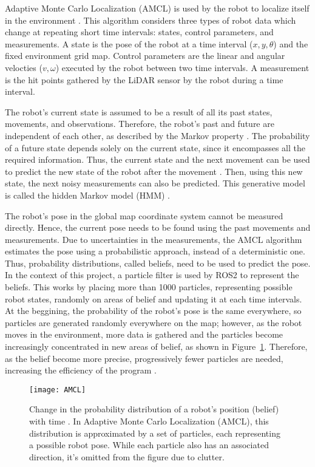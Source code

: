 Adaptive Monte Carlo Localization (AMCL) is used by the robot to localize itself in the environment \parencite{thrunProbabilisticRobotics2006}. This algorithm considers three types of robot data which change at repeating short time intervals: states, control parameters, and measurements. A state is the pose of the robot at a time interval ($x,y,\theta$) and the fixed environment grid map. Control parameters are the linear and angular velocties ($v,\omega$) executed by the robot between two time intervals. A measurement is the hit points gathered by the LiDAR sensor by the robot during a time interval.

The robot's current state is assumed to be a result of all its past states, movements, and observations. Therefore, the robot's past and future are independent of each other, as described by the Markov property \parencite{MarkovProperty2024a}. The probability of a future state depends solely on the current state, since it encompasses all the required information. Thus, the current state and the next movement can be used to predict the new state of the robot after the movement \parencite{thrunProbabilisticRobotics2006}. Then, using this new state, the next noisy measurements can also be predicted. This generative model is called the hidden Markov model (HMM) \parencite{thrunProbabilisticRobotics2006}.

The robot's pose in the global map coordinate system cannot be measured directly. Hence, the current pose needs to be found using the past movements and measurements. Due to uncertainties in the measurements, the AMCL algorithm estimates the pose using a probabilistic approach, instead of a deterministic one. Thus, probability distributions, called beliefs, need to be used to predict the pose. In the context of this project, a particle filter is used by ROS2 to represent the beliefs. This works by placing more than 1000 particles, representing possible robot states, randomly on areas of belief and updating it at each time intervals. At the beggining, the probability of the robot's pose is the same everywhere, so particles are generated randomly everywhere on the map; however, as the robot moves in the environment, more data is gathered and the particles become increasingly concentrated in new areas of belief, as shown in Figure \ref{fig:belief}. Therefore, as the belief become more precise, progressively fewer particles are needed, increasing the efficiency of the program \parencite{matlabUnderstandingParticleFilter2020,thrunProbabilisticRobotics2006}.

\begin{figure}[htb]
    \texttt{[image: AMCL]}
    \centering
    \caption{Change in the probability distribution of a robot's position (belief) with time \parencite{thrunProbabilisticRobotics2006}. In Adaptive Monte Carlo Localization (AMCL), this distribution is approximated by a set of particles, each representing a possible robot pose. While each particle also has an associated direction, it's omitted from the figure due to clutter.}
    \label{fig:belief}
\end{figure}

